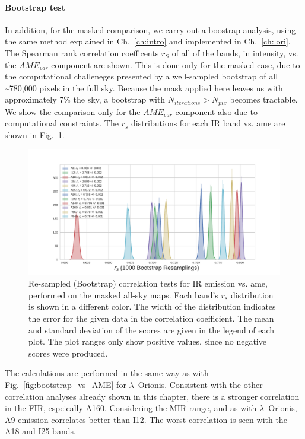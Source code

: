           \paragraph{Bootstrap test}
              In addition, for the masked comparison, we carry out a boostrap analysis, using the same method explained in Ch.~\ref{ch:intro} and implemented in Ch.~\ref{ch:lori}. The Spearman rank correlation coefficents $r_{S}$ of all of the bands, in intensity, vs. the $AME_{var}$ component are shown. This is done only for the masked case, due to the computational challeneges presented by a well-sampled bootstrap of all \textasciitilde{}780,000 pixels in the full sky. Because the mask applied here leaves us with approximately 7\% the sky, a bootstrap with $N_{iterations} > N_{pix}$ becomes tractable. We show the comparison only for the $AME_{var}$ component also due to computational constraints. The $r_{s}$ distributions for each IR band vs. \acrshort{ame} are shown in Fig.~\ref{fig:bootstrap_vs_AME_allsky_masked}.
                \begin{figure}
                     \includegraphics[width=\textwidth,trim={3cm 0.25cm 2.5cm 1cm},clip]{../Plots/ch_allsky/bootstrap_vs_AME_spearman_maskall_i1000.pdf}
                     \centering
                     \caption{Re-sampled (Bootstrap) correlation tests for IR emission vs. \acrshort{ame}, performed on the masked all-sky maps. Each band's $r_{s}$ distribution is shown in a different color. The width of the distribution indicates the error for the given data in the correlation coefficient. The mean and standard deviation of the scores are given in the legend of each plot. The plot ranges only show positive values, since no negative scores were produced. }
                     \label{fig:bootstrap_vs_AME_allsky_masked}
                \end{figure}
            The calculations are performed in the same way as with Fig.~\ref{fig:bootstrap_vs_AME} for $\lambda$~Orionis. Consistent with the other correlation analyses already shown in this chapter, there is a stronger correlation in the FIR, espeically A160. Considering the MIR range, and as with $\lambda$~Orionis, A9 emission correlates better than I12. The worst correlation is seen with the A18 and I25 bands.
